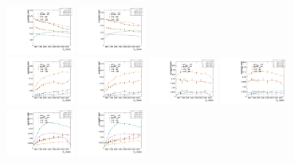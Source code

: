 \begin{figure}[htbp]
  \includegraphics[width=0.2\textwidth]{fig/2Dfit/paramSignalYield_NonVBFSig_mu_LP_nobb_LDy.pdf}
  \includegraphics[width=0.2\textwidth]{fig/2Dfit/paramSignalYield_NonVBFSig_e_LP_nobb_LDy.pdf}\\
  \includegraphics[width=0.2\textwidth]{fig/2Dfit/paramSignalYield_NonVBFSig_mu_HP_vbf_LDy.pdf}
  \includegraphics[width=0.2\textwidth]{fig/2Dfit/paramSignalYield_NonVBFSig_e_HP_vbf_LDy.pdf}
  \includegraphics[width=0.2\textwidth]{fig/2Dfit/paramSignalYield_NonVBFSig_mu_LP_vbf_LDy.pdf}
  \includegraphics[width=0.2\textwidth]{fig/2Dfit/paramSignalYield_NonVBFSig_e_LP_vbf_LDy.pdf}\\
  \includegraphics[width=0.2\textwidth]{fig/2Dfit/paramSignalYield_NonVBFSig_mu_HP_bb_HDy.pdf}
  \includegraphics[width=0.2\textwidth]{fig/2Dfit/paramSignalYield_NonVBFSig_e_HP_bb_HDy.pdf}

\end{figure}
